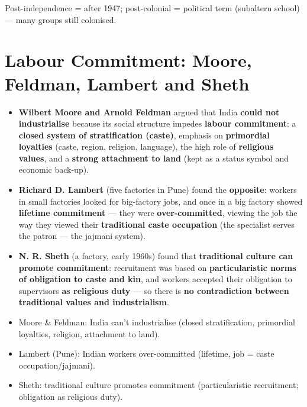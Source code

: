 \begin{QuickRevision}
Post-independence = after 1947; post-colonial = political term (subaltern school) --- many groups still colonised.
\end{QuickRevision}

\section{Labour Commitment: Moore, Feldman, Lambert and Sheth}

\begin{KeyConcept}
\begin{itemize}
\item \textbf{Wilbert Moore and Arnold Feldman} argued that India \textbf{could not industrialise} because its social structure impedes \textbf{labour commitment}: a \textbf{closed system of stratification (caste)}, emphasis on \textbf{primordial loyalties} (caste, region, religion, language), the high role of \textbf{religious values}, and a \textbf{strong attachment to land} (kept as a status symbol and economic back-up).
\item \textbf{Richard D. Lambert} (five factories in Pune) found the \textbf{opposite}: workers in small factories looked for big-factory jobs, and once in a big factory showed \textbf{lifetime commitment} --- they were \textbf{over-committed}, viewing the job the way they viewed their \textbf{traditional caste occupation} (the specialist serves the patron --- the jajmani system).
\item \textbf{N. R. Sheth} (a factory, early 1960s) found that \textbf{traditional culture can promote commitment}: recruitment was based on \textbf{particularistic norms of obligation to caste and kin}, and workers accepted their obligation to supervisors \textbf{as religious duty} --- so there is \textbf{no contradiction between traditional values and industrialism}.
\end{itemize}
\end{KeyConcept}

\begin{QuickRevision}
\begin{itemize}
\item Moore \& Feldman: India can't industrialise (closed stratification, primordial loyalties, religion, attachment to land).
\item Lambert (Pune): Indian workers over-committed (lifetime, job = caste occupation/jajmani).
\item Sheth: traditional culture promotes commitment (particularistic recruitment; obligation as religious duty).
\end{itemize}
\end{QuickRevision}

